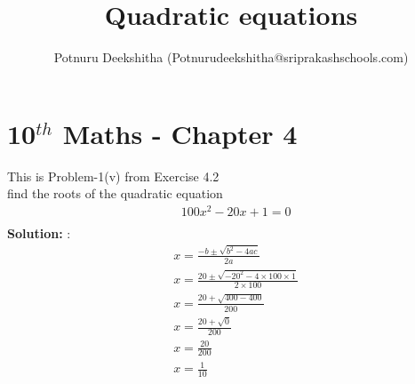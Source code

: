 \documentclass[12pt]{article}
\title{Quadratic equations}
\author{Potnuru Deekshitha (Potnurudeekshitha@sriprakashschools.com)}
\newcommand{\solution}{\noindent \textbf{Solution: }}
\begin{document}
\section*{10$^{th}$ Maths - Chapter 4}
This is Problem-1(v) from Exercise 4.2\\
find the roots of the quadratic equation\\
\begin{align*}
&{100}x^2-{20} x +{1} = 0\\
\end{align*}
\solution:\\
\begin{align*}
&x=\frac{-b\pm\sqrt{b^2-4ac}}{2a}\\
&x=\frac{20\pm\sqrt{-20^2-4 \times 100\times1}}{2 \times 100}\\
&x=\frac{20+\sqrt{400-400}}{200}\\
&x=\frac{20+\sqrt{0}}{200}\\
&x=\frac{20}{200}\\
&x=\frac{1}{10}
\end{align*}
\end{document}
